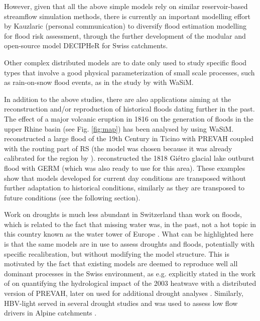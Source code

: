 \documentclass[10pt,a4paper]{article}
\begin{document}
However, given that all the above simple models rely on similar
reservoir-based streamflow simulation methods, there is currently an
important modelling effort by Kauzlaric (personal communication) to
diversify flood estimation modelling for flood risk assessment, through
the further development of the modular and open-source model DECIPHeR
for Swiss catchments.

Other complex distributed models are to date only used to study specific
flood types that involve a good physical parameterization of small scale
processes, such as rain-on-snow flood events, as in the study
by \citet{Rossler2014} with WaSiM. 

In addition to the above studies, there are also applications aiming at
the reconstruction and/or reproduction of historical floods dating
further in the past. The effect of a major volcanic eruption in 1816 on
the generation of floods in the upper Rhine basin (see
Fig. \ref{fig:map}) has been analysed
by \citet{Rossler2018} using WaSiM. \citet{Stucki2018} reconstructed
a large flood of the 19th Century in Ticino with PREVAH coupled with the
routing part of RS (the model was chosen because it was already
calibrated for the region
by \citet{Andres_2016}). \citet{Ancey2019} reconstructed the 1818
Giétro glacial lake outburst flood with GERM (which was also ready to
use for this area). These examples show that models developed for
current day conditions are transposed without further adaptation to
historical conditions, similarly as they are transposed to future
conditions (see the following section).

Work on droughts is much less abundant in Switzerland than work on
floods, which is related to the fact that missing water was, in the
past, not a hot topic in this country known as the water tower of
Europe \citep{Milano2015}. What can be highlighted here is that the same
models are in use to assess droughts and floods, potentially with
specific recalibration, but without modifying the model structure. This
is motivated by the fact that existing models are deemed to reproduce
well all dominant processes in the Swiss environment, as e.g. explicitly
stated in the work of \citet{Zappa2007a} on quantifying the hydrological
impact of the 2003 heatwave with a distributed version of PREVAH, later
on used for additional drought analyses \citep{Brunner2019,Zappa2019}. Similarly,
HBV-light served in several drought studies \citep{Staudinger2014,Staudinger2014a,Staudinger2015} 
and was used to assess low flow drivers in Alpine catchments \citep{Arnoux_2020}.
\end{document}
